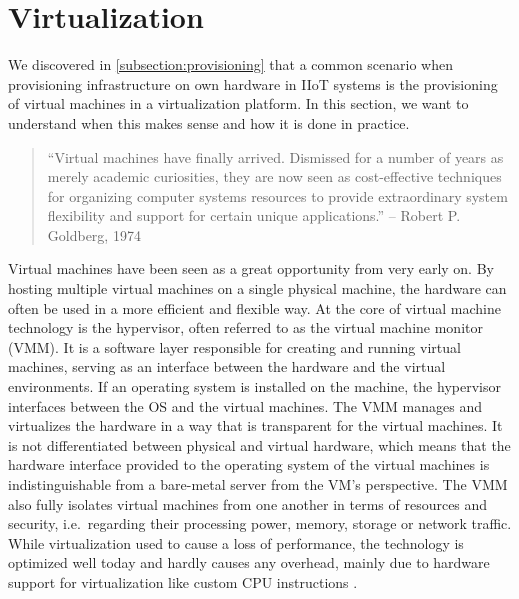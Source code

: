 \section{Virtualization}
\label{section:virtualization}

    We discovered in \autoref{subsection:provisioning} that a common scenario when provisioning infrastructure on own hardware in IIoT systems is the provisioning of virtual machines in a virtualization platform. In this section, we want to understand when this makes sense and how it is done in practice.\newline

    \begin{quote}
        ``Virtual machines have finally arrived. Dismissed for a number of years as merely academic curiosities, they are now seen as cost-effective techniques for organizing computer systems resources to provide extraordinary system flexibility and support for certain unique applications.'' -- Robert P. Goldberg, 1974 \cite{vs_anforderungsprofil}
    \end{quote}

    \noindent Virtual machines have been seen as a great opportunity from very early on. By hosting multiple virtual machines on a single physical machine, the hardware can often be used in a more efficient and flexible way. At the core of virtual machine technology is the hypervisor, often referred to as the virtual machine monitor (VMM). It is a software layer responsible for creating and running virtual machines, serving as an interface between the hardware and the virtual environments. If an operating system is installed on the machine, the hypervisor interfaces between the OS and the virtual machines. The VMM manages and virtualizes the hardware in a way that is transparent for the virtual machines. It is not differentiated between physical and virtual hardware, which means that the hardware interface provided to the operating system of the virtual machines is indistinguishable from a bare-metal server from the VM's perspective. The VMM also fully isolates virtual machines from one another in terms of resources and security, i.e.\ regarding their processing power, memory, storage or network traffic. While virtualization used to cause a loss of performance, the technology is optimized well today and hardly causes any overhead, mainly due to hardware support for virtualization like custom CPU instructions \cite{vs_anforderungsprofil}. \newline 

